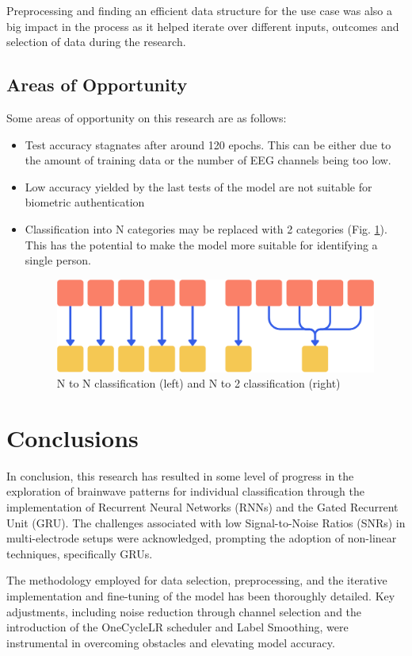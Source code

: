 \documentclass[11pt, a4paper, oneside]{assets/tex/thesis} %
\begin{document}
{Preprocessing and finding an efficient data structure for the use case was also a big impact in the process as it helped iterate over different inputs, outcomes and selection of data during the research.

\section{Areas of Opportunity}
Some areas of opportunity on this research are as follows:
\begin{itemize}
    \item Test accuracy stagnates after around 120 epochs. This can be either due to the amount of training data or the number of EEG channels being too low.
    \item Low accuracy yielded by the last tests of the model are not suitable for biometric authentication
    \item Classification into N categories may be replaced with 2 categories (Fig. \ref{fig:categories_graphic}). This has the potential to make the model more suitable for identifying a single person.
    \begin{figure}[h]
        \centering
        \includegraphics[width=0.6\linewidth]{assets/img/n_to_n_and_n_to_2.png}
        \caption{N to N classification (left) and N to 2 classification (right)}
        \label{fig:categories_graphic}
    \end{figure}
\end{itemize}

\chapter{Conclusions}
\label{Ch5}
In conclusion, this research has resulted in some level of progress in the exploration of brainwave patterns for individual classification through the implementation of Recurrent Neural Networks (RNNs) and the Gated Recurrent Unit (GRU). The challenges associated with low Signal-to-Noise Ratios (SNRs) in multi-electrode setups were acknowledged, prompting the adoption of non-linear techniques, specifically GRUs.

The methodology employed for data selection, preprocessing, and the iterative implementation and fine-tuning of the model has been thoroughly detailed. Key adjustments, including noise reduction through channel selection and the introduction of the OneCycleLR scheduler and Label Smoothing, were instrumental in overcoming obstacles and elevating model accuracy.

}
\end{document}
